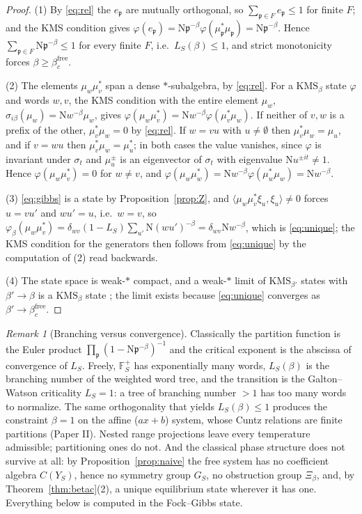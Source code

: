 \documentclass[11pt]{amsart}
\numberwithin{equation}{section}
\theoremstyle{definition}
\theoremstyle{remark}
\newtheorem{remark}[theorem]{Remark}
\newcommand{\F}{\mathbb{F}}
\newcommand{\pp}{\mathfrak{p}}
\newcommand{\Ns}{\mathrm{N}}
\newcommand{\bfree}{\beta_c^{\mathrm{free}}}
\begin{document}
\begin{proof}
(1) By \eqref{eq:rel} the $e_\pp$ are mutually orthogonal, so $\sum_{\pp\in F}e_\pp\le1$ for
finite $F$; and the KMS condition gives
$\varphi(e_\pp)=\Ns\pp^{-\beta}\varphi(\mu_\pp^*\mu_\pp)=\Ns\pp^{-\beta}$. Hence
$\sum_{\pp\in F}\Ns\pp^{-\beta}\le1$ for every finite $F$, i.e.\ $L_S(\beta)\le1$, and strict
monotonicity forces $\beta\ge\bfree$.

(2) The elements $\mu_w\mu_v^*$ span a dense $*$-subalgebra, by \eqref{eq:rel}. For a
$\mathrm{KMS}_\beta$ state $\varphi$ and words $w,v$, the KMS condition with the entire
element $\mu_w$, $\sigma_{i\beta}(\mu_w)=\Ns w^{-\beta}\mu_w$, gives
$\varphi(\mu_w\mu_v^*)=\Ns w^{-\beta}\varphi(\mu_v^*\mu_w)$. If neither of $v,w$ is a prefix
of the other, $\mu_v^*\mu_w=0$ by \eqref{eq:rel}. If $w=vu$ with $u\ne\emptyset$ then
$\mu_v^*\mu_w=\mu_u$, and if $v=wu$ then $\mu_v^*\mu_w=\mu_u^*$; in both cases the value
vanishes, since $\varphi$ is invariant under $\sigma_t$ and $\mu_u^{\pm}$ is an eigenvector
of $\sigma_t$ with eigenvalue $\Ns u^{\pm it}\ne1$. Hence $\varphi(\mu_w\mu_v^*)=0$ for
$w\ne v$, and $\varphi(\mu_w\mu_w^*)=\Ns w^{-\beta}\varphi(\mu_w^*\mu_w)=\Ns w^{-\beta}$.

(3) \eqref{eq:gibbs} is a state by Proposition~\ref{prop:Z}, and
$\langle\mu_w\mu_v^*\xi_u,\xi_u\rangle\ne0$ forces $u=vu'$ and $wu'=u$, i.e.\ $w=v$, so
$\varphi_\beta(\mu_w\mu_v^*)=\delta_{wv}(1-L_S)\sum_{u'}\Ns(wu')^{-\beta}=\delta_{wv}\Ns w^{-\beta}$,
which is \eqref{eq:unique}; the KMS condition for the generators then follows from
\eqref{eq:unique} by the computation of (2) read backwards.

(4) The state space is weak-$*$ compact, and a weak-$*$ limit of $\mathrm{KMS}_{\beta'}$
states with $\beta'\to\beta$ is a $\mathrm{KMS}_\beta$ state \cite[Prop.~5.3.25]{BR};
the limit exists because \eqref{eq:unique} converges as $\beta'\to\bfree$.
\end{proof}

\begin{remark}[Branching versus convergence]\label{rem:branch}
Classically the partition function is the Euler product
$\prod_\pp(1-\Ns\pp^{-\beta})^{-1}$ and the critical exponent is the abscissa of convergence
of $L_S$. Freely, $\F_S^+$ has exponentially many words, $L_S(\beta)$ is the branching number
of the weighted word tree, and the transition is the Galton--Watson criticality $L_S=1$: a
tree of branching number $>1$ has too many words to normalize. The same orthogonality that
yields $L_S(\beta)\le1$ produces the constraint $\beta=1$ on the affine ($ax+b$) system,
whose Cuntz relations are finite partitions (Paper II). Nested range projections leave
every temperature admissible; partitioning ones do not. And the classical phase structure
does not survive at all: by Proposition~\ref{prop:naive} the free system has no coefficient
algebra $C(Y_S)$, hence no symmetry group $G_S$, no obstruction group $\Xi_\beta$, and, by
Theorem~\ref{thm:betac}(2), a unique equilibrium state wherever it has one. Everything
below is computed in the Fock--Gibbs state.
\end{remark}
\end{document}
